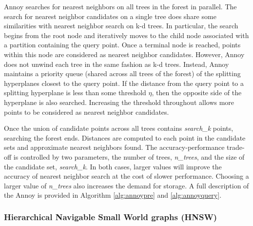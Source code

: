 \documentclass[11pt,a4paper,]{article}
\begin{document}
Annoy searches for nearest neighbors on all trees in the forest in parallel. The search for nearest neighbor candidates on a single tree does share some similarities with nearest neighbor search on k-d trees. In particular, the search begins from the root node and iteratively moves to the child node associated with a partition containing the query point. Once a terminal node is reached, points within this node are considered as nearest neighbor candidates. However, Annoy does not unwind each tree in the same fashion as k-d trees. Instead, Annoy maintains a priority queue (shared across all trees of the forest) of the splitting hyperplanes closest to the query point. If the distance from the query point to a splitting hyperplane is less than some threshold \(\eta\), then the opposite side of the hyperplane is also searched. Increasing the threshold throughout allows more points to be considered as nearest neighbor candidates.

Once the union of candidate points across all trees contains \textit{search\_k} points, searching the forest ends. Distances are computed to each point in the candidate sets and approximate nearest neighbors found. The accuracy-performance trade-off is controlled by two parameters, the number of trees, \textit{n\_trees}, and the size of the candidate set, \textit{search\_k}. In both cases, larger values will improve the accuracy of nearest neighbor search at the cost of slower performance. Choosing a larger value of \textit{n\_trees} also increases the demand for storage. A full description of the Annoy is provided in Algorithm \ref{alg:annoypre} and \ref{alg:annoyquery}.

\hypertarget{hierarchical-navigable-small-world-graphs-hnsw}{%
\subsubsection*{Hierarchical Navigable Small World graphs (HNSW)}\label{hierarchical-navigable-small-world-graphs-hnsw}}
\end{document}
